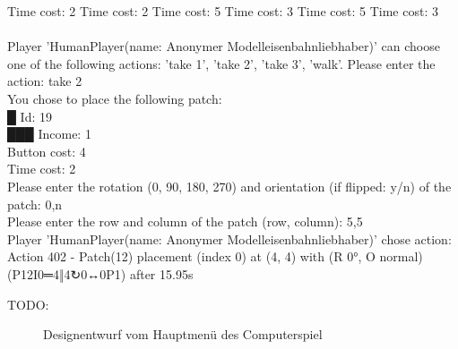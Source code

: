 {Time cost: 2      Time cost: 2      Time cost: 5      Time cost: 3      Time cost: 5       Time cost: 3  \\
\\
Player 'HumanPlayer(name: Anonymer Modelleisenbahnliebhaber)' can choose one of the following actions: 'take 1', 'take 2', 'take 3', 'walk'. Please enter the action: take 2 \\
You chose to place the following patch: \\
█   Id: 19 \\
███ Income: 1 \\
Button cost: 4 \\
Time cost: 2          \\
Please enter the  rotation (0, 90, 180, 270) and orientation (if flipped: y/n) of the patch: 0,n \\
Please enter the row and column of the patch (row, column): 5,5 \\
Player 'HumanPlayer(name: Anonymer Modelleisenbahnliebhaber)' chose action: Action 402 - Patch(12) placement (index 0) at (4, 4) with (R 0°, O normal) (P12I0═4‖4↻0↔0P1) after 15.95s \\
}

TODO:

\begin{figure}[!ht]
    \centering
    \caption{Designentwurf vom Hauptmenü des Computerspiel}
    \label{fig:design-main-ui}
\end{figure}

